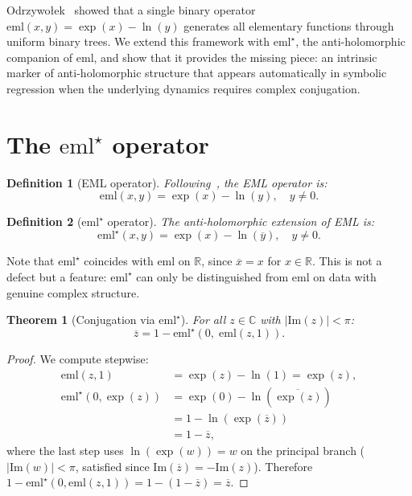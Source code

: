 \documentclass[12pt,a4paper]{article}
\newtheorem{theorem}{Theorem}
\newtheorem{definition}{Definition}
\newcommand{\emlstar}{\mathrm{eml}^{\star}}
\newcommand{\eml}{\mathrm{eml}}
\newcommand{\conj}[1]{\overline{#1}}
\begin{document}
Odrzywołek~\citep{odrzywołek2026eml} showed that a single binary
operator $\eml(x,y) = \exp(x) - \ln(y)$ generates all elementary
functions through uniform binary trees.
We extend this framework with $\emlstar$, the anti-holomorphic
companion of $\eml$, and show that it provides the missing piece:
an intrinsic marker of anti-holomorphic structure that appears
automatically in symbolic regression when the underlying dynamics
requires complex conjugation.


\section{The $\emlstar$ operator}
\label{sec:emlstar}

\begin{definition}[EML operator]
Following~\citet{odrzywołek2026eml}, the EML operator is:
\begin{equation}
\eml(x,y) = \exp(x) - \ln(y), \quad y \neq 0.
\end{equation}
\end{definition}

\begin{definition}[$\emlstar$ operator]
The anti-holomorphic extension of EML is:
\begin{equation}
\emlstar(x,y) = \exp(x) - \ln(\conj{y}), \quad y \neq 0.
\label{eq:emlstar}
\end{equation}
\end{definition}

\noindent
Note that $\emlstar$ coincides with $\eml$ on $\mathbb{R}$,
since $\conj{x} = x$ for $x \in \mathbb{R}$.
This is not a defect but a feature:
$\emlstar$ can only be distinguished from $\eml$ on data with
genuine complex structure.

\begin{theorem}[Conjugation via $\emlstar$]
\label{thm:conj}
For all $z \in \mathbb{C}$ with $|\mathrm{Im}(z)| < \pi$:
\begin{equation}
\conj{z} = 1 - \emlstar\!\left(0,\; \eml(z, 1)\right).
\label{eq:conj}
\end{equation}
\end{theorem}

\begin{proof}
We compute stepwise:
\begin{align}
\eml(z, 1) &= \exp(z) - \ln(1) = \exp(z), \\
\emlstar(0, \exp(z)) &= \exp(0) - \ln(\conj{\exp(z)}) \\
  &= 1 - \ln(\exp(\conj{z})) \\
  &= 1 - \conj{z},
\end{align}
where the last step uses $\ln(\exp(w)) = w$ on the principal branch
($|\mathrm{Im}(w)| < \pi$, satisfied since $\mathrm{Im}(\conj{z}) = -\mathrm{Im}(z)$).
Therefore $1 - \emlstar(0, \eml(z,1)) = 1 - (1 - \conj{z}) = \conj{z}$.
\end{proof}
\end{document}
